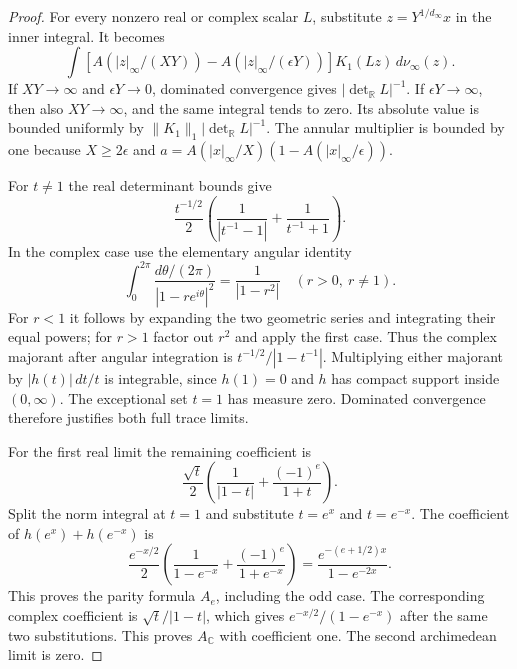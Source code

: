 \begin{proof}
For every nonzero real or complex scalar $L$,
substitute $z=Y^{1/d_\infty}x$ in the inner
integral.  It becomes
\[
 \int\left[
        A(|z|_\infty/(XY))
         -A(|z|_\infty/(\epsilon Y))
      \right]K_1(Lz)\,d\nu_\infty(z).
\tag{MA-CQ.28}
\]
If $XY\to\infty$ and $\epsilon Y\to0$,
dominated convergence gives
$|\det_{\mathbb R}L|^{-1}$.
If $\epsilon Y\to\infty$, then also
$XY\to\infty$, and the same integral
tends to zero.
Its absolute value is bounded uniformly
by $\|K_1\|_1|\det_{\mathbb R}L|^{-1}$.
The annular multiplier is bounded by one
because $X\ge2\epsilon$ and
$a=A(|x|_\infty/X)(1-A(|x|_\infty/\epsilon))$.

For $t\ne1$ the real determinant bounds
give
\[
 \frac{t^{-1/2}}2
      \left(\frac1{|t^{-1}-1|}
                        +\frac1{t^{-1}+1}\right).
\tag{MA-CQ.29}
\]
In the complex case use the elementary
angular identity
\[
 \int_0^{2\pi}
   \frac{d\theta/(2\pi)}{|1-r e^{i\theta}|^2}
                       =\frac1{|1-r^2|}\quad(r>0,\ r\ne1).
\tag{MA-CQ.30}
\]
For $r<1$ it follows by expanding the two
geometric series and integrating their
equal powers; for $r>1$ factor out $r^2$
and apply the first case.
Thus the complex majorant after angular
integration is
$t^{-1/2}/|1-t^{-1}|$.
Multiplying either majorant by
$|h(t)|\,dt/t$ is integrable, since
$h(1)=0$ and $h$ has compact support
inside $(0,\infty)$.
The exceptional set $t=1$ has measure
zero.  Dominated convergence therefore
justifies both full trace limits.

For the first real limit the remaining
coefficient is
\[
 \frac{\sqrt t}{2}
           \left(\frac1{|1-t|}
                          +\frac{(-1)^e}{1+t}\right).
\]
Split the norm integral at $t=1$ and
substitute $t=e^x$ and $t=e^{-x}$.
The coefficient of $h(e^x)+h(e^{-x})$
is
\[
 \frac{e^{-x/2}}2
    \left(\frac1{1-e^{-x}}
                          +\frac{(-1)^e}{1+e^{-x}}\right)
       =\frac{e^{-(e+1/2)x}}{1-e^{-2x}}.
\tag{MA-CQ.31}
\]
This proves the parity formula $A_e$,
including the odd case.
The corresponding complex coefficient
is $\sqrt t/|1-t|$, which gives
$e^{-x/2}/(1-e^{-x})$ after the same
two substitutions.  This proves
$A_{\mathbb C}$ with coefficient one.
The second archimedean limit is zero.


\end{proof}
